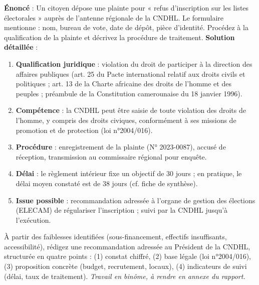 \documentclass[11pt]{article}
\begin{document}
\begin{exoresolu}
\textbf{Énoncé} : Un citoyen dépose une plainte pour « refus d'inscription sur les listes électorales » auprès de l'antenne régionale de la CNDHL. Le formulaire mentionne : nom, bureau de vote, date de dépôt, pièce d'identité. Procédez à la qualification de la plainte et décrivez la procédure de traitement.
\tcblower
\textbf{Solution détaillée} :
\begin{enumerate}
    \item \textbf{Qualification juridique} : violation du droit de participer à la direction des affaires publiques (art. 25 du Pacte international relatif aux droits civils et politiques ; art. 13 de la Charte africaine des droits de l'homme et des peuples ; préambule de la Constitution camerounaise du 18 janvier 1996).
    \item \textbf{Compétence} : la CNDHL peut être saisie de toute violation des droits de l'homme, y compris des droits civiques, conformément à ses missions de promotion et de protection (loi n°2004/016).
    \item \textbf{Procédure} : enregistrement de la plainte (N° 2023-0087), accusé de réception, transmission au commissaire régional pour enquête.
    \item \textbf{Délai} : le règlement intérieur fixe un objectif de 30 jours ; en pratique, le délai moyen constaté est de 38 jours (cf. fiche de synthèse).
    \item \textbf{Issue possible} : recommandation adressée à l'organe de gestion des élections (ELECAM) de régulariser l'inscription ; suivi par la CNDHL jusqu'à l'exécution.
\end{enumerate}
\end{exoresolu}

\begin{exercice}
À partir des faiblesses identifiées (sous-financement, effectifs insuffisants, accessibilité), rédigez une recommandation adressée au Président de la CNDHL, structurée en quatre points : (1) constat chiffré, (2) base légale (loi n°2004/016), (3) proposition concrète (budget, recrutement, locaux), (4) indicateurs de suivi (délai, taux de traitement). \emph{Travail en binôme, à rendre en annexe du rapport.}
\end{exercice}
\end{document}
